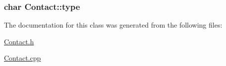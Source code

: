 \subsubsection[{\texorpdfstring{type}{type}}]{\setlength{\rightskip}{0pt plus 5cm}char Contact\+::type\hspace{0.3cm}{\ttfamily [protected]}}\hypertarget{classContact_ad76971e3edec9fdbc665d149cfbd9e1a}{}\label{classContact_ad76971e3edec9fdbc665d149cfbd9e1a}


The documentation for this class was generated from the following files\+:\begin{DoxyCompactItemize}
\item 
\hyperlink{Contact_8h}{Contact.\+h}\item 
\hyperlink{Contact_8cpp}{Contact.\+cpp}\end{DoxyCompactItemize}
